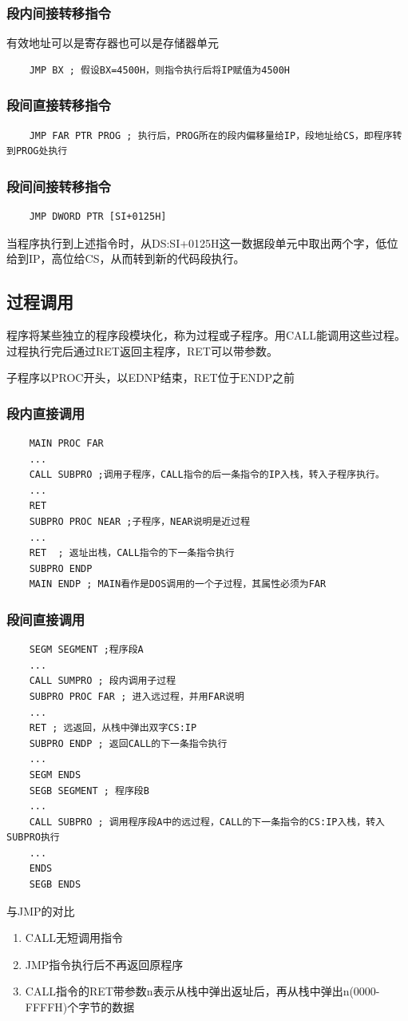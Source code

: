 \subsubsection{段内间接转移指令}
有效地址可以是寄存器也可以是存储器单元
\begin{lstlisting}
    JMP BX ; 假设BX=4500H，则指令执行后将IP赋值为4500H
\end{lstlisting}
\subsubsection{段间直接转移指令}
\begin{lstlisting}
    JMP FAR PTR PROG ; 执行后，PROG所在的段内偏移量给IP，段地址给CS，即程序转到PROG处执行
\end{lstlisting}
\subsubsection{段间间接转移指令}
\begin{lstlisting}
    JMP DWORD PTR [SI+0125H]
\end{lstlisting}
当程序执行到上述指令时，从DS:SI+0125H这一数据段单元中取出两个字，低位给到IP，高位给CS，从而转到新的代码段执行。
\subsection{过程调用}
程序将某些独立的程序段模块化，称为过程或子程序。用CALL能调用这些过程。过程执行完后通过RET返回主程序，RET可以带参数。

子程序以PROC开头，以EDNP结束，RET位于ENDP之前
\subsubsection{段内直接调用}
\begin{lstlisting}
    MAIN PROC FAR 
    ... 
    CALL SUBPRO ;调用子程序，CALL指令的后一条指令的IP入栈，转入子程序执行。
    ... 
    RET 
    SUBPRO PROC NEAR ;子程序，NEAR说明是近过程
    ... 
    RET  ; 返址出栈，CALL指令的下一条指令执行
    SUBPRO ENDP 
    MAIN ENDP ; MAIN看作是DOS调用的一个子过程，其属性必须为FAR
\end{lstlisting}
\subsubsection{段间直接调用}
\begin{lstlisting}
    SEGM SEGMENT ;程序段A
    ... 
    CALL SUMPRO ; 段内调用子过程
    SUBPRO PROC FAR ; 进入远过程，并用FAR说明 
    ... 
    RET ; 远返回，从栈中弹出双字CS:IP 
    SUBPRO ENDP ; 返回CALL的下一条指令执行
    ... 
    SEGM ENDS 
    SEGB SEGMENT ; 程序段B
    ... 
    CALL SUBPRO ; 调用程序段A中的远过程，CALL的下一条指令的CS:IP入栈，转入SUBPRO执行
    ... 
    ENDS 
    SEGB ENDS 
\end{lstlisting}
与JMP的对比
\begin{enumerate}
    \item CALL无短调用指令
    \item JMP指令执行后不再返回原程序
    \item CALL指令的RET带参数n表示从栈中弹出返址后，再从栈中弹出n(0000-FFFFH)个字节的数据
\end{enumerate}

